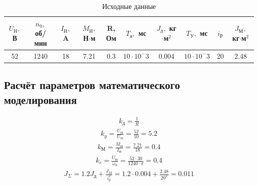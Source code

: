 \documentclass[a4paper, 11pt]{article}
\begin{document}
\begin{table}[h!]
	\centering
	\begin{threeparttable}
    	\caption{Исходные данные}\label{tab:perflogcross}
    	\begin{tabular}{|c|c|c|c|c|c|c|c|c|c|}
    		\hline
    		\makecell{$U_\text{Н},$\\В} & \makecell{$n_0,$\\об/мин} & \makecell{$I_\text{Н},$\\A} & \makecell{$M_\text{Н},$\\Н$\cdot$м} & \makecell{R,\\Ом} & \makecell{$T_\text{я},$\\мс} & \makecell{$J_\text{д},$\\кг$\cdot$м$^2$} & \makecell{$T_\text{У},$\\мс} & $i_\text{Р}$ & \makecell{$J_\text{М},$\\кг$\cdot$м$^2$} \\
    		\hline
    		52 & 1240 & 18 & 7.21 & 0.3 & $10\cdot10^-3$ &  0.004 & $10\cdot10^-3$ & 20 & 2.48\\
    		\hline
    	\end{tabular}
    \end{threeparttable}
\end{table}

\newpage
\begin{center}
	\section{Расчёт параметров математического моделирования}
\end{center}
\begin{align*} 
	\displaystyle k_\text{д}=\frac{1}{R}
\end{align*}
\begin{align*}
	\displaystyle k_y = \frac{U_\text{Н}}{U_m}=\frac{52}{10}=5.2
\end{align*}
\begin{align*}
	\displaystyle k_\text{М} = \frac{M_\text{Н}}{I_\text{Н}}=\frac{7.21}{18}=0.4
\end{align*}
\begin{align*}
	\displaystyle k_e = \frac{U_\text{Н}}{\omega_0}=\frac{52\cdot30}{1240\cdot\pi}=0.4
\end{align*}
\begin{align*}
	\displaystyle J_\Sigma=1.2J_\text{д}+\frac{J_M}{i_p^2}=1.2\cdot0.004+\frac{2.48}{20^2}=0.011
\end{align*}
\end{document}
